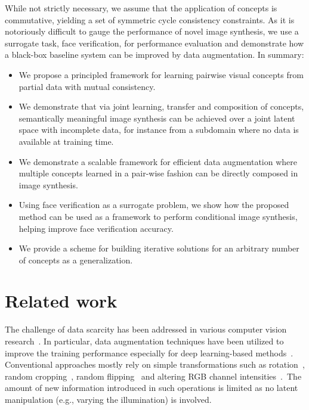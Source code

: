 \documentclass[10pt,twocolumn,letterpaper]{article}
\begin{document}
While not strictly necessary, we assume that the application of concepts is commutative, yielding a set of symmetric cycle consistency constraints. As it is notoriously difficult to gauge the performance of novel image synthesis, we use a surrogate task, face verification, for performance evaluation and demonstrate how a black-box baseline system can be improved by data augmentation. In summary:

\begin{itemize}
\setlength\itemsep{-0.3em}
\item We propose a principled framework for learning pairwise visual concepts from partial data with mutual consistency. 
\item We demonstrate that via joint learning, transfer and composition of concepts, semantically meaningful image synthesis can be achieved over a joint latent space with incomplete data, for instance from a subdomain where no data is available at training time.
\item We demonstrate a scalable framework for efficient data augmentation where multiple concepts learned in a pair-wise fashion can be directly composed in image synthesis. 
\item Using face verification as a surrogate problem, we show how the proposed method can be used as a framework to perform conditional image synthesis, helping improve face verification accuracy.
\item We provide a scheme for building iterative solutions for an arbitrary number of concepts as a generalization.
\end{itemize}

\section{Related work}

The challenge of data scarcity has been addressed in various computer vision research~\cite{data_scar1, data_scar2, kunpeng}. In particular, data augmentation techniques have been utilized to improve the training performance especially for deep learning-based methods~\cite{flipping, flipping2, cropping, pose_est}. Conventional approaches mostly rely on simple transformations such as rotation~\cite{bestprac}, random cropping~\cite{cropping}, random flipping~\cite{flipping,flipping2,cropping} and altering RGB channel intensities~\cite{altRGB}.~The amount of new information introduced in such operations is limited as no latent manipulation (e.g., varying the illumination) is involved.
\end{document}
